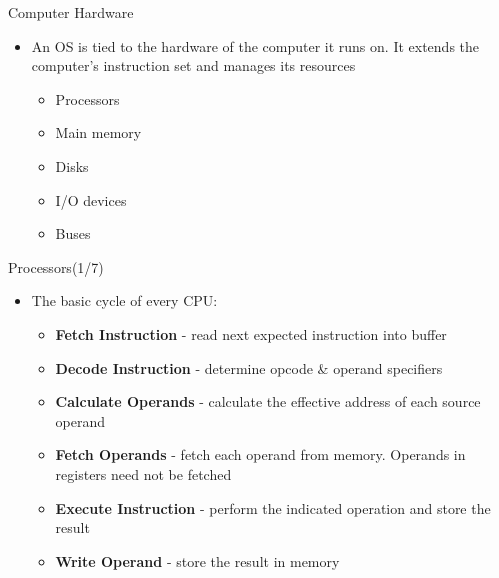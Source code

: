 \documentclass{beamer}
\begin{document}
\begin{frame}
{\centerline{Computer Hardware}}
\begin{itemize}
    \item An OS is tied to the hardware of the computer it runs on. It extends the computer’s instruction set and manages its resources
    \begin{itemize}
        \item Processors
        \item Main memory
        \item Disks
        \item I/O devices
        \item Buses
    \end{itemize}
\end{itemize}
\begin{figure}
    \centering
    
\end{figure}
\end{frame}


\begin{frame}
{\centerline{Processors(1/7)}}
\begin{itemize}
    \item The basic cycle of every CPU:
    \begin{itemize}
        \item \textbf{Fetch Instruction} - read next expected instruction into buffer
        \item\textbf{Decode Instruction} - determine opcode & operand specifiers 
        \item \textbf{Calculate Operands} - calculate the effective address of each source operand
        \item \textbf{Fetch Operands} - fetch each operand from memory. Operands in registers need not be fetched
        \item \textbf{Execute Instruction} - perform the indicated operation and store the result
        \item \textbf{Write Operand} - store the result in memory
    \end{itemize}
\end{itemize}
\end{frame}
\end{document}
